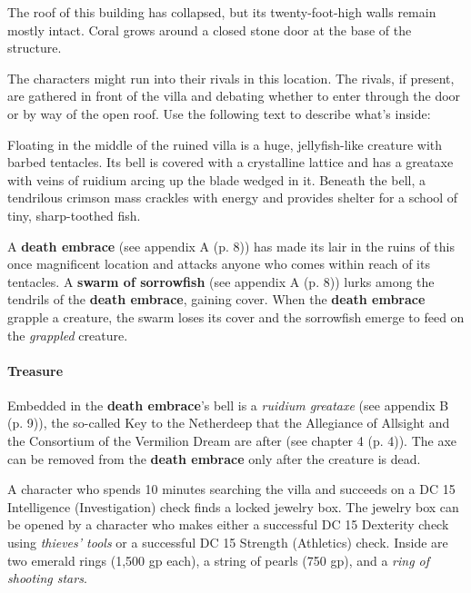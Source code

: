 \documentclass[letterpaper, 11pt, bg=full, twocolumn]{dndbook}
\begin{document}
\begin{DndReadAloud}
The roof of this building has collapsed, but its twenty-foot-high walls remain mostly intact. Coral grows around a closed stone door at the base of the structure.
\end{DndReadAloud}

The characters might run into their rivals in this location. The rivals, if present, are gathered in front of the villa and debating whether to enter through the door or by way of the open roof. Use the following text to describe what's inside:

\begin{DndReadAloud}
Floating in the middle of the ruined villa is a huge, jellyfish-like creature with barbed tentacles. Its bell is covered with a crystalline lattice and has a greataxe with veins of ruidium arcing up the blade wedged in it. Beneath the bell, a tendrilous crimson mass crackles with energy and provides shelter for a school of tiny, sharp-toothed fish.
\end{DndReadAloud}

A \textbf{death embrace} (see appendix A (p. 8)) has made its lair in the ruins of this once magnificent location and attacks anyone who comes within reach of its tentacles. A \textbf{swarm of sorrowfish} (see appendix A (p. 8)) lurks among the tendrils of the \textbf{death embrace}, gaining cover. When the \textbf{death embrace} grapple a creature, the swarm loses its cover and the sorrowfish emerge to feed on the \textit{grappled} creature.

\paragraph{Treasure}

Embedded in the \textbf{death embrace}'s bell is a \textit{ruidium greataxe} (see appendix B (p. 9)), the so-called Key to the Netherdeep that the Allegiance of Allsight and the Consortium of the Vermilion Dream are after (see chapter 4 (p. 4)). The axe can be removed from the \textbf{death embrace} only after the creature is dead.

A character who spends 10 minutes searching the villa and succeeds on a DC 15 Intelligence (Investigation) check finds a locked jewelry box. The jewelry box can be opened by a character who makes either a successful DC 15 Dexterity check using \textit{thieves' tools} or a successful DC 15 Strength (Athletics) check. Inside are two emerald rings (1,500 gp each), a string of pearls (750 gp), and a \textit{ring of shooting stars}.
\end{document}

